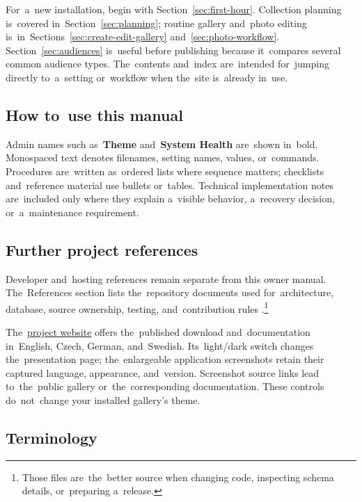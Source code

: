 \documentclass[11pt,a4paper]{article}
\newcommand{\ui}[1]{\textbf{#1}}
\begin{document}
For~a~new installation, begin with Section~\ref{sec:first-hour}. Collection
planning is~covered in~Section~\ref{sec:planning}; routine gallery and~photo
editing is~in~Sections~\ref{sec:create-edit-gallery}
and~\ref{sec:photo-workflow}. Section~\ref{sec:audiences} is~useful before
publishing because it~compares several common audience types. The~contents
and~index are~intended for~jumping directly to~a~setting or~workflow when
the~site is~already in~use.





\subsection{How to~use this manual}

Admin names such as~\ui{Theme} and~\ui{System Health} are~shown in~bold.
Monospaced text denotes filenames, setting names, values, or~commands.
Procedures are~written as~ordered lists where sequence matters; checklists
and~reference material use bullets or~tables. Technical implementation notes
are~included only where they explain a~visible behavior, a~recovery decision,
or~a~maintenance requirement.

\subsection{Further project references}

Developer and~hosting references remain separate from this owner manual.
The~References section lists the~repository documents used for~architecture,
database, source ownership, testing, and~contribution rules
\cite{readme,architecture,database,codemap,testing,agents}.\footnote{Those files
are~the~better source when changing code, inspecting schema details,
or~preparing a~release.}

The~\href{https://phpgallery.site/}{project website} offers
the~published download and~documentation in~English, Czech, German,
and~Swedish. Its~light/dark switch changes the~presentation page;
the~enlargeable application screenshots retain their captured language,
appearance, and~version. Screenshot source links lead to~the~public gallery
or~the~corresponding documentation. These controls do~not~change your
installed gallery's theme.

\subsection{Terminology}
\end{document}
